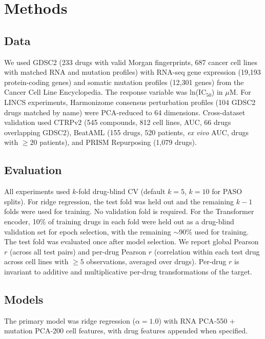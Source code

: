 \section*{Methods}

\subsection*{Data}

We used GDSC2\cite{iorio2016landscape} (233 drugs with valid Morgan fingerprints, 687 cancer cell lines with matched RNA and mutation profiles) with RNA-seq gene expression (19,193 protein-coding genes) and somatic mutation profiles (12,301 genes) from the Cancer Cell Line Encyclopedia\cite{ghandi2019next}. The response variable was ln(IC$_{50}$) in $\mu$M. For LINCS experiments, Harmonizome\cite{rouillard2016harmonizome} consensus perturbation profiles (104 GDSC2 drugs matched by name) were PCA-reduced to 64 dimensions. Cross-dataset validation used CTRPv2\cite{seashoreludlow2015} (545 compounds, 812 cell lines, AUC, 66 drugs overlapping GDSC2), BeatAML\cite{bottomly2022integrative} (155 drugs, 520 patients, \textit{ex vivo} AUC, drugs with $\geq 20$ patients), and PRISM Repurposing\cite{corsello2020prism} (1,079 drugs).

\subsection*{Evaluation}

All experiments used $k$-fold drug-blind CV (default $k = 5$, $k = 10$ for PASO splits). For ridge regression, the test fold was held out and the remaining $k-1$ folds were used for training. No validation fold is required. For the Transformer encoder, 10\% of training drugs in each fold were held out as a drug-blind validation set for epoch selection, with the remaining $\sim$90\% used for training. The test fold was evaluated once after model selection. We report global Pearson $r$ (across all test pairs) and per-drug Pearson $r$ (correlation within each test drug across cell lines with $\geq 5$ observations, averaged over drugs). Per-drug $r$ is invariant to additive and multiplicative per-drug transformations of the target.

\subsection*{Models}

The primary model was ridge regression ($\alpha = 1.0$) with RNA PCA-550 + mutation PCA-200 cell features, with drug features appended when specified.

